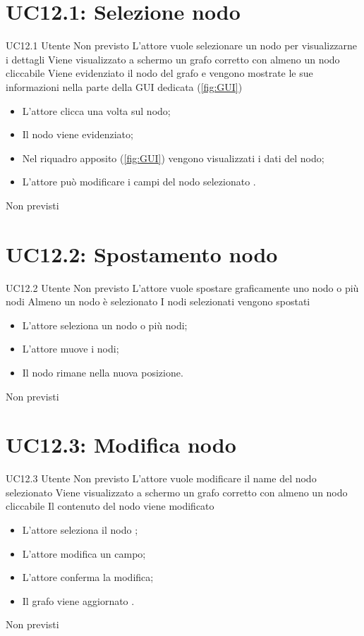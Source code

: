 \documentclass[../AnalisideiRequisiti.tex]{subfiles}
\begin{document}
	\section{UC12.1: Selezione nodo}
	\UserCase
	{UC12.1}
	{Utente}
	{Non previsto}
	{L'attore vuole selezionare un nodo per visualizzarne i dettagli}
	{Viene visualizzato a schermo un grafo corretto con almeno un nodo cliccabile }
	{Viene evidenziato il nodo del grafo e vengono mostrate le sue informazioni nella parte della GUI dedicata (\ref{fig:GUI})}
	{
		\begin{itemize}
			\item{} L'attore clicca una volta sul nodo;
			\item{} Il nodo viene evidenziato;
			\item{} Nel riquadro apposito (\ref{fig:GUI}) vengono visualizzati i dati del nodo;
			\item{} L'attore può modificare i campi del nodo selezionato .
		\end{itemize}
	}
	{Non previsti}
	
	\section{UC12.2: Spostamento nodo}
	\UserCase
	{UC12.2}
	{Utente}
	{Non previsto}
	{L'attore vuole spostare graficamente uno nodo o più nodi}
	{Almeno un nodo è selezionato }
	{I nodi selezionati vengono spostati}
	{
		\begin{itemize}
			\item{} L'attore seleziona un nodo o più nodi;
			\item{} L'attore muove i nodi;
			\item{} Il nodo rimane nella nuova posizione.
		\end{itemize}
	}
	{Non previsti}
	
	\section{UC12.3: Modifica nodo}
	\UserCase
	{UC12.3}
	{Utente}
	{Non previsto}
	{L'attore vuole modificare il name del nodo selezionato}
	{Viene visualizzato a schermo un grafo corretto con almeno un nodo cliccabile }
	{Il contenuto del nodo viene modificato}
	{
		\begin{itemize}
			\item{} L'attore seleziona il nodo ;
			\item{} L'attore modifica un campo;
			\item{} L'attore conferma la modifica;
			\item{} Il grafo viene aggiornato .
		\end{itemize}
	}
	{Non previsti}
	
\end{document}
